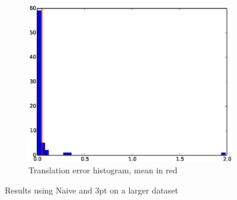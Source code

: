 \begin{figure}[htpb]
\begin{subfigure}[b]{6cm}
          \includegraphics[width=\linewidth]{img/large_desktop/naive_3pt_dist.eps}
          \caption{Translation error histogram, mean in red} 
          \label{fig:desktop_2_ferns_dist_1}
  \end{subfigure}
  \caption{Results using Naive and 3pt on a larger dataset}
\end{figure}

